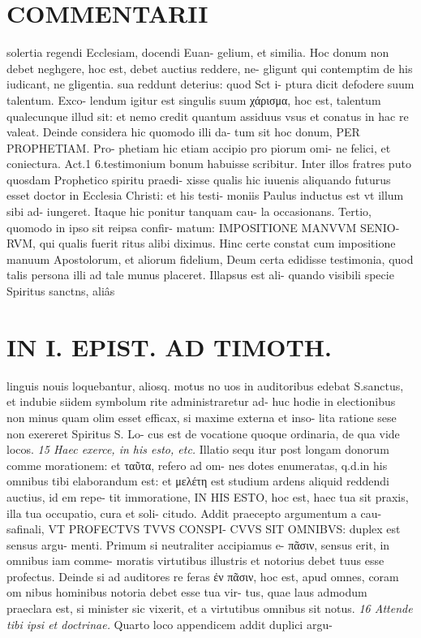 \documentclass{article}
\begin{document}
\begin{pages}
\section*{COMMENTARII }
\marginpar{[ p.112 ]}\pstart solertia regendi Ecclesiam, docendi Euan- gelium, et similia. Hoc donum non debet neghgere, hoc est, debet auctius reddere, ne- gligunt qui contemptim de his iudicant, ne gligentia. sua reddunt deterius: quod Sct i- ptura dicit defodere suum talentum. Exco- lendum igitur est singulis suum χάρισμα, hoc est, talentum qualecunque illud sit: et nemo credit quantum assiduus vsus et conatus in hac re valeat.  \pend\pstart Deinde considera hic quomodo illi da- tum sit hoc donum, PER PROPHETIAM. Pro- phetiam hic etiam accipio pro piorum omi- ne felici, et coniectura. Act.1 6.testimonium bonum habuisse scribitur. Inter illos fratres puto quosdam Prophetico spiritu praedi- xisse qualis hic iuuenis aliquando futurus esset doctor in Ecclesia Christi: et his testi- moniis Paulus inductus est vt illum sibi ad- iungeret. Itaque hic ponitur tanquam cau- la occasionans.  \pend\pstart Tertio, quomodo in ipso sit reipsa confir- matum: IMPOSITIONE MANVVM SENIO- RVM, qui qualis fuerit ritus alibi diximus. Hinc certe constat cum impositione manuum Apostolorum, et aliorum fidelium, Deum certa edidisse testimonia, quod talis persona illi ad tale munus placeret. Illapsus est ali- quando visibili specie Spiritus sanctns, aliâs  \pend
\section*{IN I. EPIST. AD TIMOTH. }
\marginpar{[ p.113 ]}\pstart linguis nouis loquebantur, aliosq. motus no uos in auditoribus edebat S.sanctus, et indubie siidem symbolum rite administraretur ad- huc hodie in electionibus non minus quam olim esset efficax, si maxime externa et inso- lita ratione sese non exereret Spiritus S. Lo- cus est de vocatione quoque ordinaria, de qua vide locos.  \pend
\textit{15 Haec exerce, in his esto, etc. }\pstart Illatio sequ itur post longam donorum comme morationem: et ταῦτα, refero ad om- nes dotes enumeratas, q.d.in his omnibus tibi elaborandum est: et μελέτη est studium ardens aliquid reddendi auctius, id em repe- tit immoratione, IN HIS ESTO, hoc est, haec tua sit praxis, illa tua occupatio, cura et soli- citudo. Addit praecepto argumentum a cau- safinali, VT PROFECTVS TVVS CONSPI- CVVS SIT OMNIBVS: duplex est sensus argu- menti. Primum si neutraliter accipiamus e- πᾶσιν, sensus erit, in omnibus iam comme- moratis virtutibus illustris et notorius debet tuus esse profectus. Deinde si ad auditores re feras ἐν πᾶσιν, hoc est, apud omnes, coram om nibus hominibus notoria debet esse tua vir- tus, quae laus admodum praeclara est, si minister sic vixerit, et a virtutibus omnibus sit notus.  \pend
\textit{16 Attende tibi ipsi et doctrinae. }\pstart Quarto loco appendicem addit duplici argu-  \pend

\end{pages}
\end{document}

